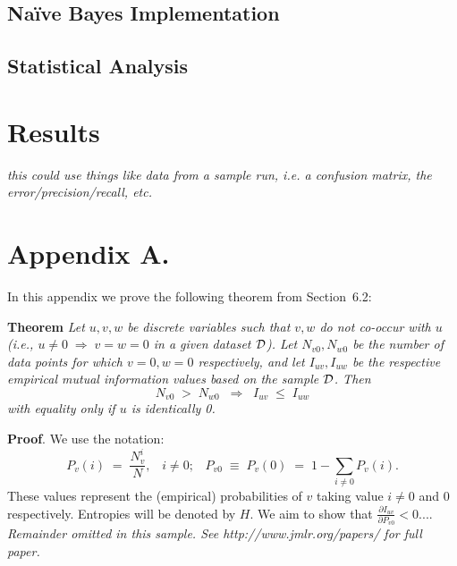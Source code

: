\documentclass[twoside,11pt]{article}
\newcommand{\dataset}{{\cal D}}
\newcommand{\fracpartial}[2]{\frac{\partial #1}{\partial  #2}}
\begin{document}
\subsection{Naïve Bayes Implementation}

\subsection{Statistical Analysis}


\section{Results}

\emph{this could use things like data from a sample run, i.e. a confusion matrix, the error/precision/recall, etc.}





\newpage

\appendix
\section*{Appendix A.}
\label{app:theorem}



In this appendix we prove the following theorem from
Section~6.2:

\noindent
{\bf Theorem} {\it Let $u,v,w$ be discrete variables such that $v, w$ do
not co-occur with $u$ (i.e., $u\neq0\;\Rightarrow \;v=w=0$ in a given
dataset $\dataset$). Let $N_{v0},N_{w0}$ be the number of data points for
which $v=0, w=0$ respectively, and let $I_{uv},I_{uw}$ be the
respective empirical mutual information values based on the sample
$\dataset$. Then
\[
	N_{v0} \;>\; N_{w0}\;\;\Rightarrow\;\;I_{uv} \;\leq\;I_{uw}
\]
with equality only if $u$ is identically 0.} \hfill\BlackBox

\noindent
{\bf Proof}. We use the notation:
\[
P_v(i) \;=\;\frac{N_v^i}{N},\;\;\;i \neq 0;\;\;\;
P_{v0}\;\equiv\;P_v(0)\; = \;1 - \sum_{i\neq 0}P_v(i).
\]
These values represent the (empirical) probabilities of $v$
taking value $i\neq 0$ and 0 respectively.  Entropies will be denoted
by $H$. We aim to show that $\fracpartial{I_{uv}}{P_{v0}} < 0$....\\

{\noindent \em Remainder omitted in this sample. See http://www.jmlr.org/papers/ for full paper.}




\vskip 0.2in

\end{document}
